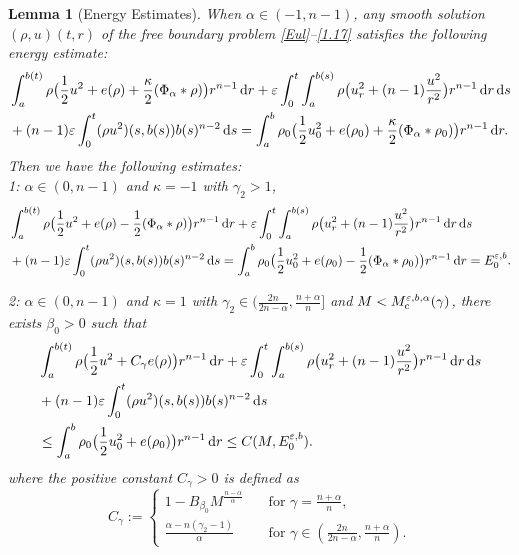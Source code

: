 \documentclass[reqno,11pt]{amsart}
\numberwithin{equation}{section}
\newtheorem{lemma}[theorem]{Lemma}
\theoremstyle{definition}
\def\dd{{\, \rm d}}
\begin{document}
\begin{lemma}[Energy Estimates]\label{Energy}
When $\alpha \in (-1,n - 1)$, any smooth solution $(\rho,u)(t,r)$ of the free boundary 
problem \eqref{Eul}--\eqref{1.17} satisfies the following energy estimate{\rm:}
    \begin{align*}
    &\int^{b(t)}_a \rho \big(\frac{1}{2}u^2 + e(\rho) + \frac{\kappa}{2}(\Phi_{\alpha} * \rho) \big)r^{n-1} \dd r 
    + \varepsilon \int^t_0\int^{b(s)}_a \rho \big(u_r^2 + (n-1)\frac{u^2}{r^2} \big) r^{n-1} \dd r\dd s \\ 
    &+ (n-1)\varepsilon\int^t_0 (\rho u^2)(s,b(s))b(s)^{n-2} \dd s 
    = \int^b_a \rho_0 \big(\frac{1}{2}u_0^2 + e(\rho_0) + \frac{\kappa}{2} (\Phi_{\alpha} * \rho_0)\big)r^{n-1} \dd r.
    \end{align*}
Then we have the following estimates{\rm:}\\[2mm] 
 {\rm 1:} $\alpha \in (0,n-1)$ and $\kappa = -1$ with $\gamma_2 > 1$,
\begin{align*}
\begin{split}
      &\int^{b(t)}_a \rho \big(\frac{1}{2}u^2 + e(\rho) - \frac{1}{2} (\Phi_{\alpha} * \rho) \big)r^{n-1} \dd r
      + \varepsilon \int^t_0\int^{b(s)}_a \rho \big(u_r^2 + (n-1)\frac{u^2}{r^2} \big) r^{n-1} \dd r\dd s \\ 
      &+ (n-1)\varepsilon\int^t_0 (\rho u^2)(s,b(s))b(s)^{n-2} \dd s 
     = \int^b_a \rho_0 \big(\frac{1}{2}u_0^2 + e(\rho_0) - \frac{1}{2} (\Phi_{\alpha} * \rho_0)\big)r^{n-1} \dd r 
= E^{\varepsilon,b}_0.
\end{split}
\end{align*}

\smallskip
{} {\rm 2:} $\alpha \in (0,n-1)$ and $\kappa = 1$ with 
$\gamma_2 \in (\frac{2n}{2n - \alpha}, \frac{n + \alpha}{n}]$ 
and $M < M^{\varepsilon,b,\alpha}_{\rm c}(\gamma)$, there exists $\beta_0 > 0$ such that
    \begin{align*}
    \begin{split}
     &\int^{b(t)}_a \rho \big(\frac{1}{2}u^2 + C_\gamma e(\rho) \big)r^{n-1} \dd r 
      + \varepsilon \int^t_0\int^{b(s)}_a \rho \big(u_r^2 + (n-1)\frac{u^2}{r^2} \big) r^{n-1} \dd r\dd s \\ 
      & + (n-1)\varepsilon\int^t_0 (\rho u^2)(s,b(s))b(s)^{n-2} \dd s \\ 
     & \leq \int^b_a \rho_0 \big(\frac{1}{2}u_0^2 + e(\rho_0)  \big)r^{n-1} \dd r 
     \leq C(M,E^{\varepsilon,b}_0).
     \end{split}
     \end{align*}
where the positive constant $C_\gamma > 0$ is defined as
\[
C_\gamma := \begin{cases}
1 - B_{\beta_0}M^{\frac{n - \alpha}{\alpha}} \quad & \mbox{for $\gamma = \frac{n + \alpha}{n}$},\\[1mm]            \frac{\alpha - n(\gamma_2-1)}{\alpha} 
& \mbox{for $\gamma \in (\frac{2n}{2n - \alpha}, \frac{n + \alpha}{n})$}.
\end{cases}
\]
    

\end{lemma}
\end{document}
